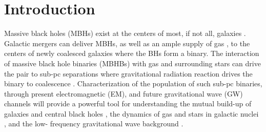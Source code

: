 

\section{Introduction} Massive black holes (MBHs) exist at the centers of
most, if not all, galaxies \citep{KR95, KormendyHo2013}. Galactic mergers can
deliver MBHs, as well as an ample supply of gas \citep{BH1992, Barnes:1996,
Barnes:2002, Mayer:2013:MBHBGasRev}, to the centers of newly coalesced
galaxies where the BHs form a binary. The interaction of massive black hole
binaries (MBHBs) with gas and surrounding stars can drive the pair to sub-pc
separations where gravitational radiation reaction drives the binary to
coalescence \citep{Begel:Blan:Rees:1980}.  Characterization of the population
of such sub-pc binaries, through present electromagnetic (EM), and future
gravitational wave (GW) channels will provide a powerful tool for
understanding the mutual build-up of galaxies and central black holes
\citep[\textit{e.g.}][]{KormendyHo2013}, the dynamics of gas and stars in
galactic nuclei \citep[\textit{e.g.}][]{MerrittMilos:2005:LRR}, and the low-
frequency gravitational wave background
\citep[\textit{e.g.}][]{KocsisSesana:2011, Shannon:2015,
Arzoumanian:2015:SGWB}.

